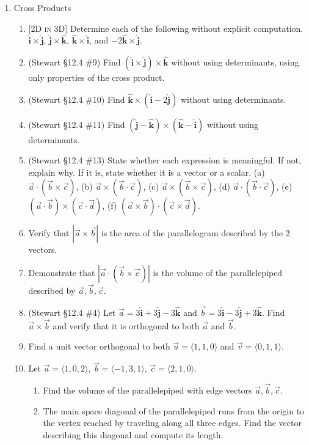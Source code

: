 \documentclass[12pt]{article}
\newcommand{\ihat}{\hat{\textbf{i}}}
\newcommand{\jhat}{\hat{\textbf{j}}}
\newcommand{\khat}{\hat{\textbf{k}}}
\newcommand{\dimtag}[1]{{\footnotesize\textsc{[#1]}}\;}
\begin{document}
\begin{enumerate}
\item Cross Products
    \begin{enumerate}
        \item \dimtag{2D in 3D} Determine each of the following without explicit computation. $\ihat \times \jhat$, $\jhat \times \khat$, $\khat \times \ihat$, and $-2 \khat \times \jhat$.
        \item (Stewart \S12.4 \#9) Find $(\ihat\times\jhat)\times\khat$ without using determinants, using only properties of the cross product.
        \item (Stewart \S12.4 \#10) Find $\khat \times (\ihat - 2\jhat)$ without using determinants.
        \item (Stewart \S12.4 \#11) Find $(\jhat - \khat)\times(\khat - \ihat)$ without using determinants.
        \item (Stewart \S12.4 \#13) State whether each expression is meaningful. If not, explain why. If it is, state whether it is a vector or a scalar.
        (a) $\vec{a}\cdot(\vec{b}\times\vec{c})$,\quad
        (b) $\vec{a}\times(\vec{b}\cdot\vec{c})$,\quad
        (c) $\vec{a}\times(\vec{b}\times\vec{c})$,\quad
        (d) $\vec{a}\cdot(\vec{b}\cdot\vec{c})$,\quad
        (e) $(\vec{a}\cdot\vec{b})\times(\vec{c}\cdot\vec{d})$,\quad
        (f) $(\vec{a}\times\vec{b})\cdot(\vec{c}\times\vec{d})$.
        \item Verify that $|\vec{a} \times \vec{b}|$ is the area of the parallelogram described by the 2 vectors.
        \item Demonstrate that $|\vec{a} \cdot (\vec{b} \times \vec{c})|$ is the volume of the parallelepiped described by $\vec{a}, \vec{b}, \vec{c}$.
        \item (Stewart \S12.4 \#4) Let $\vec{a} = 3\ihat + 3\jhat - 3\khat$ and $\vec{b} = 3\ihat - 3\jhat + 3\khat$. Find $\vec{a}\times\vec{b}$ and verify that it is orthogonal to both $\vec{a}$ and $\vec{b}$.
        \item Find a unit vector orthogonal to both $\vec{u} = \langle 1, 1, 0 \rangle$ and $\vec{v} = \langle 0, 1, 1 \rangle$.
        \item Let $\vec{a} = \langle 1, 0, 2 \rangle$, $\vec{b} = \langle -1, 3, 1 \rangle$, $\vec{c} = \langle 2, 1, 0 \rangle$.
        \begin{enumerate}
            \item Find the volume of the parallelepiped with edge vectors $\vec{a}, \vec{b}, \vec{c}$.
            \item The main space diagonal of the parallelepiped runs from the origin to the vertex reached by traveling along all three edges. Find the vector describing this diagonal and compute its length.

\end{enumerate}
\end{enumerate}
\end{enumerate}
\end{document}

